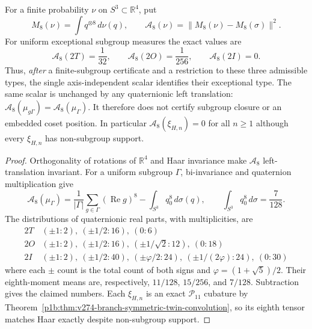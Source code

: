 \documentclass[12pt,a4paper]{article}
\begin{document}
\begin{theorem}
\label{p2a:thm:v275-eighth-moment-3class}
For a finite probability $\nu$ on $S^3\subset\mathbb R^4$, put
\[
 M_8(\nu)=\int q^{\otimes8}\,d\nu(q),\qquad
 \mathcal A_8(\nu)=\|M_8(\nu)-M_8(\sigma)\|^2.
\]
For uniform exceptional subgroup measures the exact values are
\[
 \boxed{\mathcal A_8(2T)=\frac1{32},\qquad
        \mathcal A_8(2O)=\frac1{256},\qquad
        \mathcal A_8(2I)=0.}
\]
Thus, \emph{after} a finite-subgroup certificate and a restriction
to these three admissible types, the single axis-independent
scalar identifies their exceptional type. The same scalar is
unchanged by any quaternionic left translation:
$\mathcal A_8(\mu_{g\Gamma})=\mathcal A_8(\mu_\Gamma)$.
It therefore does not certify subgroup closure or an embedded
coset position. In particular
$\mathcal A_8(\xi_{H,n})=0$ for all $n\ge1$ although every
$\xi_{H,n}$ has non-subgroup support.
\end{theorem}
\begin{proof}
Orthogonality of rotations of $\mathbb R^4$ and Haar invariance
make $\mathcal A_8$ left-translation invariant. For a uniform
subgroup $\Gamma$, bi-invariance and quaternion multiplication give
\[
 \mathcal A_8(\mu_\Gamma)
   =\frac1{|\Gamma|}\sum_{g\in\Gamma}(\operatorname{Re}g)^8
      -\int_{S^3}q_0^8\,d\sigma(q),\qquad
 \int_{S^3}q_0^8\,d\sigma=\frac7{128}.
\]
The distributions of quaternionic real parts, with multiplicities,
are
\[
\begin{array}{c|l}
2T& (\pm1:2),\ (\pm1/2:16),\ (0:6)\\
2O& (\pm1:2),\ (\pm1/2:16),\ (\pm1/\sqrt2:12),\ (0:18)\\
2I& (\pm1:2),\ (\pm1/2:40),\
 (\pm\varphi/2:24),\ (\pm1/(2\varphi):24),\ (0:30)
\end{array}
\]
where each $\pm$ count is the total count of both signs and
$\varphi=(1+\sqrt5)/2$.
Their eighth-moment means are, respectively,
$11/128$, $15/256$, and $7/128$. Subtraction gives the claimed
numbers. Each $\xi_{H,n}$ is an exact $\mathcal P_{11}$ cubature
by Theorem~\ref{p1b:thm:v274-branch-symmetric-twin-convolution},
so its eighth tensor matches Haar exactly despite non-subgroup
support.
\end{proof}
\end{document}
